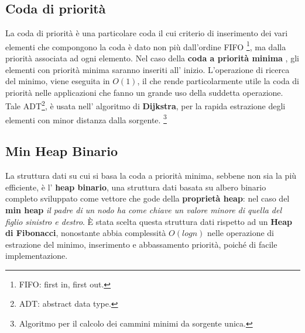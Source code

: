 \subsection{Coda di priorit\`a}
La coda di priorit\`a \`e una particolare coda il cui criterio di inserimento
dei vari elementi che compongono la coda \`e dato non pi\`u dall'ordine FIFO
\footnote{FIFO: first in, first out.},
ma dalla priorit\`a associata ad ogni elemento. Nel caso della \textbf{coda a
priorit\`a minima }, gli elementi con priorit\`a minima saranno inseriti all' 
inizio. L'operazione di ricerca del minimo, viene eseguita in $O(1)$, il che
rende particolarmente utile la coda di priorit\`a nelle applicazioni che fanno
un grande uso della suddetta operazione. Tale ADT\footnote{ADT: abstract data
type.}, \`e usata nell' algoritmo di \textbf{Dijkstra}, per la rapida
estrazione degli elementi con minor distanza dalla sorgente.
\footnote{Algoritmo per il calcolo dei cammini minimi da sorgente unica.}

\subsection{Min Heap Binario}
La struttura dati su cui si basa la coda a priorit\`a minima,
sebbene non sia la pi\`u efficiente, \`e  l'
\textbf{heap binario}, una struttura dati basata su albero binario completo
sviluppato come vettore che gode della \textbf{propriet\`a
heap}: nel caso del \textbf{min heap} \textit{il padre di un nodo ha come chiave 
un valore minore di quella del figlio sinistro e destro}. \`E stata scelta
questa struttura dati rispetto ad un \textbf{Heap di Fibonacci}, nonostante 
abbia complessit\`a $O(logn)$ nelle operazione di estrazione del minimo,
inserimento e abbassamento priorit\`a, poich\'e di facile implementazione.
